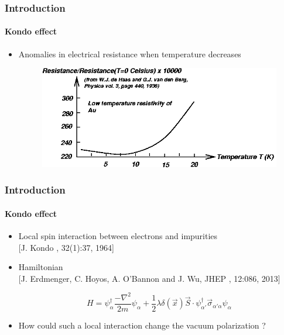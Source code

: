 \documentclass[french]{beamer}
\begin{document}




\begin{frame}
\frametitle{Introduction}
\framesubtitle{Kondo effect}
\begin{itemize}
\item Anomalies in electrical resistance when temperature decreases

\begin{figure}[!h]
  \centering
  \includegraphics[height=0.4\textheight]{kondo}
\end{figure}

\end{itemize}

\end{frame}
\begin{frame}
\frametitle{Introduction}
\framesubtitle{Kondo effect}
\begin{itemize}
\item Local spin interaction between electrons and impurities
\\
\tiny\color{blue}[J. Kondo
, 32(1):37, 1964]\color{black}\normalsize

\item Hamiltonian
\\
\tiny\color{blue}[J. Erdmenger, C. Hoyos, A. O’Bannon and J. Wu, JHEP
, 12:086, 2013]\color{black}\normalsize


\begin{equation*}
H = \psi_\alpha^\dagger \frac{-\nabla^2}{2m}\psi_\alpha +
\frac 1 2\lambda \delta(\vec{x})\vec{S}\cdot \psi_{\alpha'}^\dagger  \vec{\sigma}_{\alpha' \alpha} \psi_\alpha
\end{equation*}

\item How could such a local interaction change the vacuum polarization ?
\end{itemize}

\end{frame}
\end{document}
